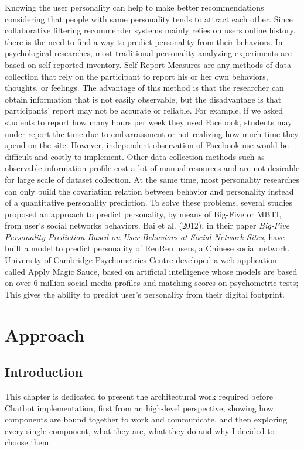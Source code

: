 \documentclass[b5paper,10pt,twoside,cucitura]{toptesi}
\begin{document}
Knowing the user personality can help to make better recommendations considering that people with same personality tends to attract each other. Since collaborative filtering recommender systems mainly relies on users online history, there is the need to find a way to predict personality from their behaviors. In psychological researches, most traditional personality analyzing experiments are based on self-reported inventory. Self-Report Measures are any methods of data collection that rely on the participant to report his or her own behaviors, thoughts, or feelings. The advantage of this method is that the researcher can obtain information that is not easily observable, but the disadvantage is that participants' report may not be accurate or reliable. For example, if we asked students to report how many hours per week they used Facebook, students may under-report the time due to embarrassment or not realizing how much time they spend on the site. However, independent observation of Facebook use would be difficult and costly to implement.
Other data collection methods such as observable information profile cost a lot of manual resources and are not desirable for large scale of dataset collection. At the same time, most personality researches can only build the covariation relation between behavior and personality instead of a quantitative personality prediction.
To solve these problems, several studies proposed an approach to predict personality, by means of Big-Five or MBTI, from user's social networks behaviors. Bai et al. (2012), in their paper \textit{Big-Five Personality Prediction Based on User Behaviors at Social Network Sites}, have built a model to predict personality of RenRen users, a Chinese social network. University of Cambridge Psychometrics Centre developed a web application called Apply Magic Sauce, based on artificial intelligence whose models are based on over 6 million social media profiles and matching scores on psychometric tests; This gives the ability to predict user's personality from their digital footprint.    


\chapter{Approach}

\section{Introduction}

This chapter is dedicated to present the architectural work required before Chatbot implementation, first from an high-level perspective, showing how components are bound together to work and communicate, and then exploring every single component, what they are, what they do and why I decided to choose them. 
\end{document}
